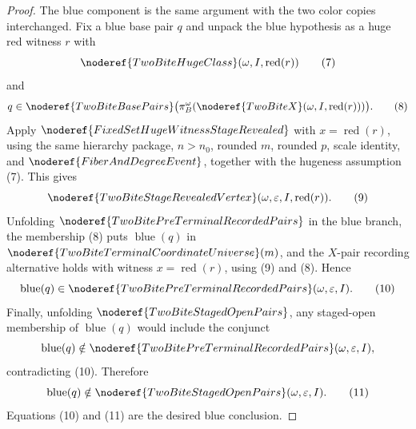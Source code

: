 \begin{proof}
The blue component is the same argument with the two color copies interchanged.
Fix a blue base pair \(q\) and unpack the blue hypothesis as a huge red witness
\(r\) with
\[
\noderef{TwoBiteHugeClass}(\omega,I,\operatorname{red}(r))
\tag{7}
\]
and
\[
q\in\noderef{TwoBiteBasePairs}
\bigl(\pi_B^\omega(\noderef{TwoBiteX}
(\omega,I,\operatorname{red}(r)))\bigr). \tag{8}
\]
Apply \(\noderef{FixedSetHugeWitnessStageRevealed}\) with
\(x=\operatorname{red}(r)\), using the same hierarchy package, \(n>n_0\),
rounded \(m\), rounded \(p\), scale identity, and
\(\noderef{FiberAndDegreeEvent}\), together with the hugeness assumption (7).
This gives
\[
\noderef{TwoBiteStageRevealedVertex}
(\omega,\varepsilon,I,\operatorname{red}(r)).
\tag{9}
\]
Unfolding \(\noderef{TwoBitePreTerminalRecordedPairs}\) in the blue branch,
the membership (8) puts \(\operatorname{blue}(q)\) in
\(\noderef{TwoBiteTerminalCoordinateUniverse}(m)\), and the \(X\)-pair
recording alternative holds with witness \(x=\operatorname{red}(r)\), using
(9) and (8).  Hence
\[
\operatorname{blue}(q)\in
\noderef{TwoBitePreTerminalRecordedPairs}(\omega,\varepsilon,I).
\tag{10}
\]
Finally, unfolding \(\noderef{TwoBiteStagedOpenPairs}\), any staged-open
membership of \(\operatorname{blue}(q)\) would include the conjunct
\[
\operatorname{blue}(q)\notin
\noderef{TwoBitePreTerminalRecordedPairs}(\omega,\varepsilon,I),
\]
contradicting (10).  Therefore
\[
\operatorname{blue}(q)\notin
\noderef{TwoBiteStagedOpenPairs}(\omega,\varepsilon,I).
\tag{11}
\]
Equations (10) and (11) are the desired blue conclusion.
\end{proof}
